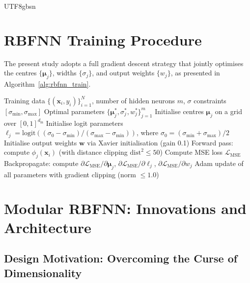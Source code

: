 \documentclass[a4paper,12pt]{report}
\begin{document}
\begin{CJK}{UTF8}{gbsn}
\section{RBFNN Training Procedure}
\label{sec:rbfnn_training}

The present study adopts a full gradient descent strategy that jointly optimises the
centres $\{\boldsymbol{\mu}_j\}$, widths $\{\sigma_j\}$, and output weights $\{w_j\}$,
as presented in Algorithm~\ref{alg:rbfnn_train}.

\begin{algorithm}[H]
  \caption{End-to-end gradient training of RBFNN}
  \label{alg:rbfnn_train}
  \begin{algorithmic}[1]
    \REQUIRE Training data $\{(\mathbf{x}_i, y_i)\}_{i=1}^N$, number of hidden neurons $m$,
      $\sigma$ constraints $[\sigma_{\min},\sigma_{\max}]$
    \ENSURE Optimal parameters $\{\boldsymbol{\mu}_j^*, \sigma_j^*, w_j^*\}_{j=1}^m$
    \STATE Initialise centres $\boldsymbol{\mu}_j$ on a grid over $[0,1]^{d_{\text{in}}}$
    \STATE Initialise logit parameters $\ell_j = \mathrm{logit}((\sigma_0-\sigma_{\min})/(\sigma_{\max}-\sigma_{\min}))$,
      where $\sigma_0 = (\sigma_{\min}+\sigma_{\max})/2$
    \STATE Initialise output weights $\mathbf{w}$ via Xavier initialisation (gain 0.1)
        \STATE Forward pass: compute $\phi_j(\mathbf{x}_i)$ (with distance clipping $\mathrm{dist}^2 \leq 50$)
        \STATE Compute MSE loss $\mathcal{L}_{\text{MSE}}$
        \STATE Backpropagate: compute $\partial\mathcal{L}_{\text{MSE}}/\partial\boldsymbol{\mu}_j$,
          $\partial\mathcal{L}_{\text{MSE}}/\partial\ell_j$, $\partial\mathcal{L}_{\text{MSE}}/\partial w_j$
        \STATE Adam update of all parameters with gradient clipping (norm $\leq 1.0$)
      \ENDFOR
    \ENDFOR
  \end{algorithmic}
\end{algorithm}

\section{Modular RBFNN: Innovations and Architecture}
\label{sec:modular_rbfnn}

\subsection{Design Motivation: Overcoming the Curse of Dimensionality}
\label{subsec:modular_motivation}


\end{CJK}
\end{document}
